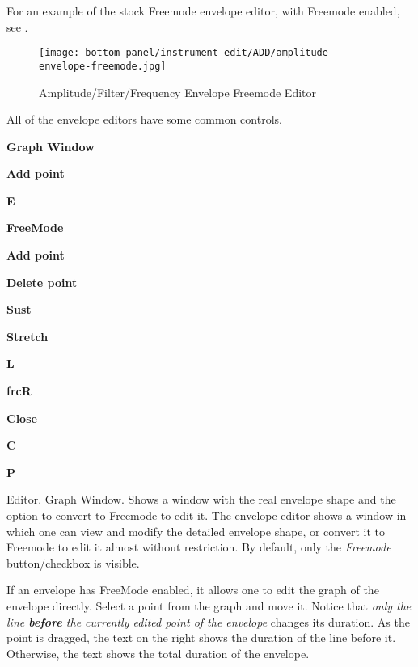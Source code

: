   For an example of the stock Freemode envelope editor, with
   Freemode enabled, see .

\begin{figure}[H]
   \centering
   \texttt{[image: bottom-panel/instrument-edit/ADD/amplitude-envelope-freemode.jpg]}
   \caption{Amplitude/Filter/Frequency Envelope Freemode Editor}
   \label{fig:amplitude_envelope_freemode}
\end{figure}

   All of the envelope editors have some common controls.

   \begin{enumber}
      \item \textbf{Graph Window}
      \item \textbf{Add point}
      \item \textbf{E}
      \item \textbf{FreeMode}
      \item \textbf{Add point}
      \item \textbf{Delete point}
      \item \textbf{Sust}
      \item \textbf{Stretch}
      \item \textbf{L}
      \item \textbf{frcR}
      \item \textbf{Close}
      \item \textbf{C}
      \item \textbf{P}
   \end{enumber}

   \setcounter{ItemCounter}{0}      %

   Editor.  Graph Window.
   Shows a window with the real envelope shape and the option to convert to
   Freemode to edit it.
   The envelope editor shows a window in which one can view and modify the
   detailed envelope shape, or convert it to Freemode to edit it almost
   without restriction.
   By default, only the \textsl{Freemode} button/checkbox is visible.

   If an envelope has FreeMode enabled, it allows one to edit the
   graph of the envelope directly. Select a point from the graph and move it.
   Notice that
   \textsl{only the line \textbf{before} the currently edited point of the
   envelope} changes its duration.
   As the point is dragged, the text on the right shows the duration of
   the line before it. Otherwise, the text shows the total duration of the
   envelope.

